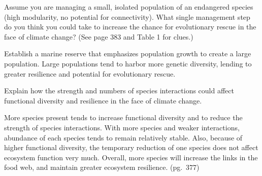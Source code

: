 \documentclass[12pt, addpoints]{exam}
\begin{document}
\begin{questions}
\question[5]
Assume you are managing a small, isolated population of an endangered 
species (high modularity, no potential for connectivity). What single 
management step do you think you could take to increase the chance
for evolutionary rescue in the face of climate change? (See page 383 and Table 1 for clues.)


\begin{solution}
Establish a marine reserve that emphasizes population growth to create a large population. Large populations tend to harbor more genetic diversity, lending to greater resilience and potential for evolutionary rescue.
\end{solution}

\question[5]
Explain how the strength and numbers of species interactions could affect functional diversity and resilience in the face of climate change.


\begin{solution}
More species present tends to increase functional diversity and to reduce the strength of species interactions. With more species and weaker interactions, abundance of each species tends to remain relatively stable. Also, because of higher functional diversity, the temporary reduction of one species does not affect ecosystem function very much. Overall, more species will increase the links in the food web, and maintain greater ecosystem resilience. (pg.~377)
\end{solution}

\end{questions}

%
%
%
%
%	
%
\end{document}
